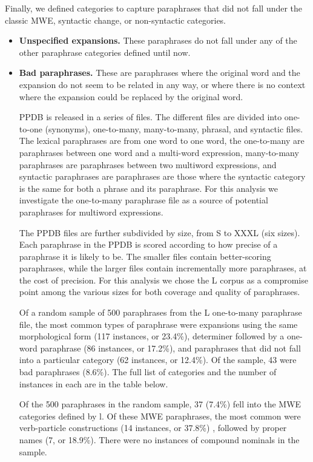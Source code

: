 \documentclass[11pt]{article}
\begin{document}
Finally, we defined categories to capture paraphrases that did not fall under the classic MWE, syntactic change, or non-syntactic categories.
\begin{itemize}
\item \textbf{Unspecified expansions.} These paraphrases do not fall under any of the other paraphrase categories defined until now. 

\item \textbf{Bad paraphrases.} These are paraphrases where the original word and the expansion do not seem to be related in any way, or where there is no context where the expansion could be replaced by the original word. 

PPDB is released in a series of files. The different files are divided into one-to-one (synonyms), one-to-many, many-to-many, phrasal, and syntactic files. The lexical paraphrases are from one word to one word, the one-to-many are paraphrases between one word and a multi-word expression, many-to-many paraphrases are paraphrases between two multiword expressions, and syntactic paraphrases are paraphrases are those where the syntactic category is the same for both a phrase and its paraphrase. For this analysis we investigate the one-to-many paraphrase file as a source of potential paraphrases for multiword expressions.

The PPDB files are further subdivided by size, from S to XXXL (six sizes). Each paraphrase in the PPDB is scored according to how precise of a paraphrase it is likely to be. The smaller files contain better-scoring paraphrases, while the larger files contain incrementally more paraphrases, at the cost of precision. For this analysis we chose the L corpus as a compromise point among the various sizes for both coverage and quality of paraphrases.

Of a random sample of 500 paraphrases from the L one-to-many paraphrase file, the most common types of paraphrase were expansions using the same morphological form (117 instances, or 23.4\%), determiner followed by a one-word paraphrase (86 instances, or 17.2\%), and paraphrases that did not fall into a particular category (62 instances, or 12.4\%). Of the sample, 43 were bad paraphrases (8.6\%). The full list of categories and the number of instances in each are in the table below.  

Of the 500 paraphrases in the random sample, 37 (7.4\%) fell into the MWE categories defined by l. Of these MWE paraphrases, the most common were verb-particle constructions (14 instances, or 37.8\%) , followed by proper names (7, or 18.9\%). There were no instances of compound nominals in the sample.


\end{itemize}
\end{document}
